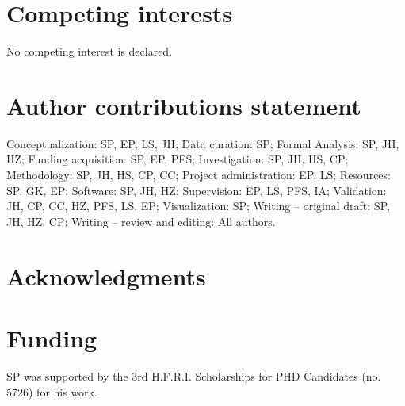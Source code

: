 \documentclass[a4paper,12pt]{article}
\begin{document}
\section{Competing interests}
No competing interest is declared.

\section{Author contributions statement}
Conceptualization: SP, EP, LS, JH;
Data curation: SP;
Formal Analysis: SP, JH, HZ;
Funding acquisition: SP, EP, PFS;
Investigation: SP, JH, HS, CP;
Methodology: SP, JH, HS, CP, CC;
Project administration: EP, LS;
Resources: SP, GK, EP;
Software: SP, JH, HZ;
Supervision: EP, LS, PFS, IA;
Validation: JH, CP, CC, HZ, PFS, LS, EP;
Visualization: SP;
Writing – original draft: SP, JH, HZ, CP;
Writing – review and editing: All authors.

\section{Acknowledgments}

\section{Funding}
SP was supported by the 3rd H.F.R.I. Scholarships for PHD Candidates (no. 5726) for his work.

\printbibliography[heading=bibintoc]
\end{document}
